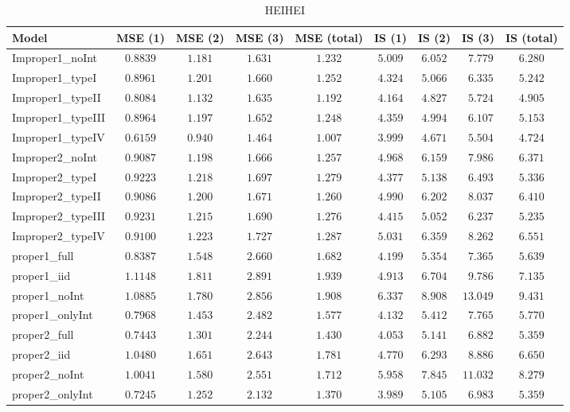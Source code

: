 \begin{table}

\caption{\label{tab:model-choice-sc12}HEIHEI}
\centering
\begin{tabular}{lcccccccc}
\hline
Model  & MSE (1) & MSE (2) & MSE (3) & MSE (total) & IS (1) & IS (2) & IS (3) & \multicolumn{1}{c}{IS (total)} \\ 
\hline
Improper1_noInt  & $0.8839$ & $1.181$ & $1.631$ & $1.232$ & $5.009$ & $6.052$ & $\phantom{0}7.779$ & $6.280$ \\
Improper1_typeI  & $0.8961$ & $1.201$ & $1.660$ & $1.252$ & $4.324$ & $5.066$ & $\phantom{0}6.335$ & $5.242$ \\
Improper1_typeII  & $0.8084$ & $1.132$ & $1.635$ & $1.192$ & $4.164$ & $4.827$ & $\phantom{0}5.724$ & $4.905$ \\
Improper1_typeIII  & $0.8964$ & $1.197$ & $1.652$ & $1.248$ & $4.359$ & $4.994$ & $\phantom{0}6.107$ & $5.153$ \\
Improper1_typeIV  & $0.6159$ & $0.940$ & $1.464$ & $1.007$ & $3.999$ & $4.671$ & $\phantom{0}5.504$ & $4.724$ \\
Improper2_noInt  & $0.9087$ & $1.198$ & $1.666$ & $1.257$ & $4.968$ & $6.159$ & $\phantom{0}7.986$ & $6.371$ \\
Improper2_typeI  & $0.9223$ & $1.218$ & $1.697$ & $1.279$ & $4.377$ & $5.138$ & $\phantom{0}6.493$ & $5.336$ \\
Improper2_typeII  & $0.9086$ & $1.200$ & $1.671$ & $1.260$ & $4.990$ & $6.202$ & $\phantom{0}8.037$ & $6.410$ \\
Improper2_typeIII  & $0.9231$ & $1.215$ & $1.690$ & $1.276$ & $4.415$ & $5.052$ & $\phantom{0}6.237$ & $5.235$ \\
Improper2_typeIV  & $0.9100$ & $1.223$ & $1.727$ & $1.287$ & $5.031$ & $6.359$ & $\phantom{0}8.262$ & $6.551$ \\
proper1_full  & $0.8387$ & $1.548$ & $2.660$ & $1.682$ & $4.199$ & $5.354$ & $\phantom{0}7.365$ & $5.639$ \\
proper1_iid  & $1.1148$ & $1.811$ & $2.891$ & $1.939$ & $4.913$ & $6.704$ & $\phantom{0}9.786$ & $7.135$ \\
proper1_noInt  & $1.0885$ & $1.780$ & $2.856$ & $1.908$ & $6.337$ & $8.908$ & $13.049$ & $9.431$ \\
proper1_onlyInt  & $0.7968$ & $1.453$ & $2.482$ & $1.577$ & $4.132$ & $5.412$ & $\phantom{0}7.765$ & $5.770$ \\
proper2_full  & $0.7443$ & $1.301$ & $2.244$ & $1.430$ & $4.053$ & $5.141$ & $\phantom{0}6.882$ & $5.359$ \\
proper2_iid  & $1.0480$ & $1.651$ & $2.643$ & $1.781$ & $4.770$ & $6.293$ & $\phantom{0}8.886$ & $6.650$ \\
proper2_noInt  & $1.0041$ & $1.580$ & $2.551$ & $1.712$ & $5.958$ & $7.845$ & $11.032$ & $8.279$ \\
proper2_onlyInt  & $0.7245$ & $1.252$ & $2.132$ & $1.370$ & $3.989$ & $5.105$ & $\phantom{0}6.983$ & $5.359$ \\
\hline 
\end{tabular}

\end{table}